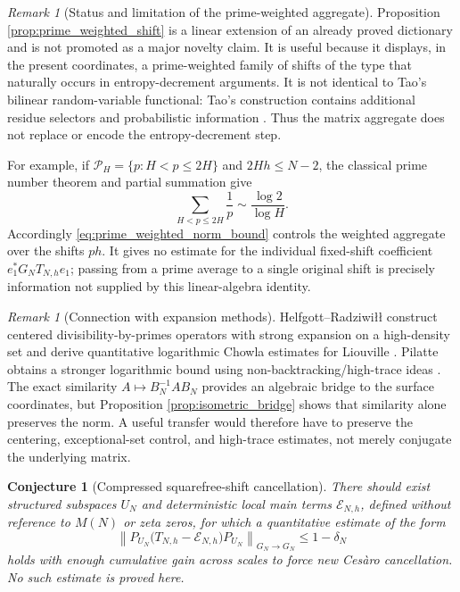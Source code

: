 \documentclass[11pt]{amsart}
\numberwithin{equation}{section}
\theoremstyle{plain}
\newtheorem{conjecture}[theorem]{Conjecture}
\theoremstyle{definition}
\theoremstyle{remark}
\newtheorem{remark}[theorem]{Remark}
\begin{document}
\begin{remark}[Status and limitation of the prime-weighted aggregate]
\label{rem:prime_weighted_status}
Proposition \ref{prop:prime_weighted_shift} is a linear extension of an already proved dictionary and is not promoted as a major novelty claim.  It is useful because it displays, in the present coordinates, a prime-weighted family of shifts of the type that naturally occurs in entropy-decrement arguments.  It is not identical to Tao's bilinear random-variable functional: Tao's construction contains additional residue selectors and probabilistic information \cite{Tao2016}.  Thus the matrix aggregate does not replace or encode the entropy-decrement step.

For example, if $\mathcal P_H=\{p:H<p\le2H\}$ and $2Hh\le N-2$, the classical prime number theorem and partial summation give
\begin{equation}
\sum_{H<p\le2H}\frac1p
\sim\frac{\log 2}{\log H}.
\label{eq:dyadic_prime_reciprocal_sum}
\end{equation}
Accordingly \eqref{eq:prime_weighted_norm_bound} controls the weighted aggregate over the shifts $ph$.  It gives no estimate for the individual fixed-shift coefficient $e_1^*G_NT_{N,h}e_1$; passing from a prime average to a single original shift is precisely information not supplied by this linear-algebra identity.
\end{remark}

\begin{remark}[Connection with expansion methods]
\label{rem:expansion_methods}
Helfgott--Radziwiłł construct centered divisibility-by-primes operators with strong expansion on a high-density set and derive quantitative logarithmic Chowla estimates for Liouville \cite{HelfgottRadziwill2021}.  Pilatte obtains a stronger logarithmic bound using non-backtracking/high-trace ideas \cite{Pilatte2026}.  The exact similarity $A\mapsto B_N^{-1}AB_N$ provides an algebraic bridge to the surface coordinates, but Proposition \ref{prop:isometric_bridge} shows that similarity alone preserves the norm.  A useful transfer would therefore have to preserve the centering, exceptional-set control, and high-trace estimates, not merely conjugate the underlying matrix.
\end{remark}

\begin{conjecture}[Compressed squarefree-shift cancellation]
\label{conj:compressed_cancellation}
There should exist structured subspaces $U_N$ and deterministic local main terms $\mathcal E_{N,h}$, defined without reference to $M(N)$ or zeta zeros, for which a quantitative estimate of the form
\begin{equation}
\left\|P_{U_N}\bigl(T_{N,h}-\mathcal E_{N,h}\bigr)P_{U_N}\right\|_{G_N\to G_N}
\le 1-\delta_N
\label{eq:compressed_gap_conjecture}
\end{equation}
holds with enough cumulative gain across scales to force new Cesàro cancellation.  No such estimate is proved here.
\end{conjecture}
\end{document}
